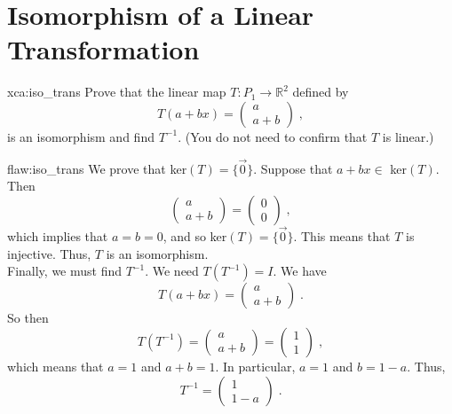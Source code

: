 \section{Isomorphism of a Linear Transformation}

\begin{xca}{xca:iso_trans}
Prove that the linear map $T: P_1 \rightarrow \mathbb{R}^2$ defined by
$$T(a + bx) = \begin{pmatrix} a \\ a + b \end{pmatrix}\;,
$$
is an isomorphism and find $T^{-1}.$ (You do not need to confirm that $T$ is linear.)
\end{xca}

\begin{flaw}{flaw:iso_trans} %
We prove that ker$(T) = \{ \vec{0} \}$. Suppose that $a + bx \in$ ker$(T)$. Then
$$\begin{pmatrix} a \\ a + b \end{pmatrix} = \begin{pmatrix} 0 \\ 0 \end{pmatrix}\;, $$
which implies that $a = b = 0$, and so ker$(T) = \{ \vec{0} \}.$ This means that $T$ is injective. Thus, $T$ is an isomorphism. \\

Finally, we must find $T^{-1}.$ We need $T(T^{-1})=I.$ We have
$$T(a + bx) = \begin{pmatrix} a \\ a + b \end{pmatrix}\;.$$
So then
$$T(T^{-1}) = \begin{pmatrix} a \\ a + b \end{pmatrix} = \begin{pmatrix} 1 \\ 1 \end{pmatrix}\;, $$
which means that $a=1$ and $a + b = 1.$ In particular, $a = 1$ and $b = 1-a.$
Thus,
$$T^{-1} = \begin{pmatrix} 1 \\ 1-a \end{pmatrix}\;.$$
\end{flaw}

